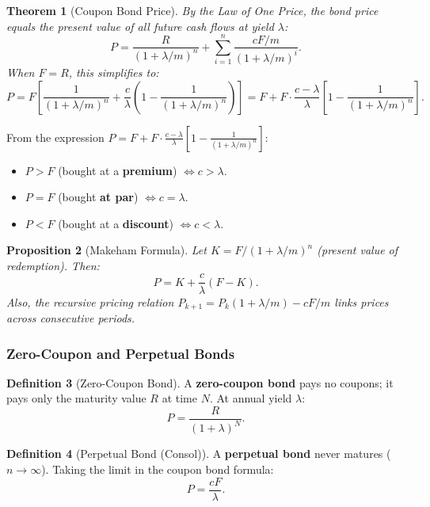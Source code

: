 \documentclass[12pt, a4paper]{article}
\theoremstyle{plain}
\newtheorem{theorem}{Theorem}[section]
\newtheorem{proposition}[theorem]{Proposition}
\theoremstyle{definition}
\newtheorem{definition}[theorem]{Definition}
\theoremstyle{remark}
\newenvironment{sidenote}{%
  \par\vspace{0.5em}%
  \noindent\color{defcolor}%
}{%
  \par\vspace{0.5em}%
  \color{black}%
}
\begin{document}
\begin{theorem}[Coupon Bond Price]
  By the Law of One Price, the bond price equals the present value of all future cash flows at yield $\lambda$:
  \[
    P = \frac{R}{(1+\lambda/m)^n} + \sum_{i=1}^n \frac{cF/m}{(1+\lambda/m)^i}.
  \]
  When $F = R$, this simplifies to:
  \[
    P = F\left[\frac{1}{(1+\lambda/m)^n} + \frac{c}{\lambda}\left(1 - \frac{1}{(1+\lambda/m)^n}\right)\right] = F + F\cdot\frac{c-\lambda}{\lambda}\left[1 - \frac{1}{(1+\lambda/m)^n}\right].
  \]
\end{theorem}

\begin{sidenote}
  From the expression $P = F + F\cdot\frac{c-\lambda}{\lambda}\!\left[1 - \frac{1}{(1+\lambda/m)^n}\right]$:
  \begin{itemize}
    \item $P > F$ (bought at a \textbf{premium}) $\iff c > \lambda$.
    \item $P = F$ (bought \textbf{at par}) $\iff c = \lambda$.
    \item $P < F$ (bought at a \textbf{discount}) $\iff c < \lambda$.
  \end{itemize}
\end{sidenote}

\begin{proposition}[Makeham Formula]
  Let $K = F/(1+\lambda/m)^n$ (present value of redemption). Then:
  \[
    P = K + \frac{c}{\lambda}(F - K).
  \]
  Also, the recursive pricing relation $P_{k+1} = P_k(1+\lambda/m) - cF/m$ links prices across consecutive periods.
\end{proposition}

\subsubsection{Zero-Coupon and Perpetual Bonds}

\begin{definition}[Zero-Coupon Bond]
  A \textbf{zero-coupon bond} pays no coupons; it pays only the maturity value $R$ at time $N$. At annual yield $\lambda$:
  \[
    P = \frac{R}{(1+\lambda)^N}.
  \]
\end{definition}

\begin{definition}[Perpetual Bond (Consol)]
  A \textbf{perpetual bond} never matures ($n \to \infty$). Taking the limit in the coupon bond formula:
  \[
    P = \frac{cF}{\lambda}.
  \]
\end{definition}
\end{document}
